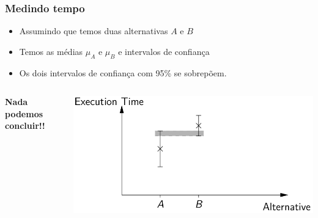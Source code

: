 \documentclass[xcolor={usenames,dvipsnames},12pt,presentation,aspectratio=169]{beamer}
\begin{document}
\begin{frame}[fragile]
  \frametitle{Medindo tempo}
  \begin{itemize}
    \item Assumindo que temos duas alternativas $A$ e $B$ 
    \item Temos as médias $\mu_{A}$ e $\mu_{B}$ e intervalos de confiança
    \item Os dois intervalos de confiança com 95\% se sobrepõem.
  \end{itemize}
  \begin{columns}
    \begin{column}{0.4\textwidth}
    \textbf{Nada podemos concluir!!}
    \end{column}
    \begin{column}{0.6\textwidth}
      \begin{center}
        \includegraphics[width=\textwidth]{ci2.png}
     \end{center}           
    \end{column}
  \end{columns}
\end{frame}
\end{document}
